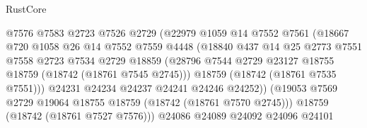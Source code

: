 \begin{lexlean}{RustCore}
\begin{coremodule}
                                  @7576
                                  @7583
                                  @2723
                                  @7526
                                  @2729
                                  (@22979
                                    @1059
                                    @14
                                    @7552
                                    @7561
                                    (@18667
                                      @720
                                      @1058
                                      @26
                                      @14
                                      @7552
                                      @7559
                                      @4448
                                      (@18840
                                        @437
                                        @14
                                        @25
                                        @2773
                                        @7551
                                        @7558
                                        @2723
                                        @7534
                                        @2729
                                        @18859
                                        (@28796
                                          @7544
                                          @2729
                                          @23127
                                          @18755
                                          @18759
                                          (@18742 (@18761 @7545 @2745)))
                                        @18759
                                        (@18742 (@18761 @7535 @7551)))
                                      @24231
                                      @24234
                                      @24237
                                      @24241
                                      @24246
                                      @24252))
                                  (@19053
                                    @7569
                                    @2729
                                    @19064
                                    @18755
                                    @18759
                                    (@18742 (@18761 @7570 @2745)))
                                  @18759
                                  (@18742 (@18761 @7527 @7576)))
                                @24086
                                @24089
                                @24092
                                @24096
                                @24101

\end{coremodule}
\end{lexlean}
